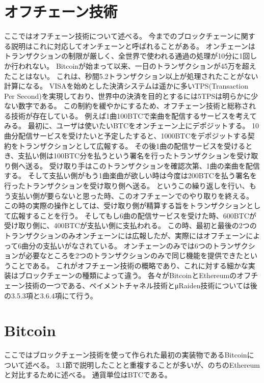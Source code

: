 \section{オフチェーン技術}
ここではオフチェーン技術について述べる。
今までのブロックチェーンに関する説明はこれに対応してオンチェーンと呼ばれることがある。
オンチェーンはトランザクションの制限が厳しく、全世界で使われる通過の処理が10分に1回しか行われない。
Bitcoinが始まって以来、一日のトランザクションが45万を超えたことはない。
これは、秒間5.2トランザクション以上が処理されたことがない計算になる。
VISAを始めとした決済システムは遥かに多いTPS(Transaction Per Second)を実現しており、世界中の決済を目的とするには5TPSは明らかに少ない数字である。
この制約を緩やかにするため、オフチェーン技術と総称される技術が存在している。
例えば1曲100BTCで楽曲を配信するサービスを考えてみる。
最初に、ユーザは使いたいBTCをオンチェーン上にデポジットする。
10曲分配信サービスを受けたいと予定したすると、1000BTCをデポジットする契約をトランザクションとして広報する。
その後1曲の配信サービスを受けるとき、支払い側は100BTC分を払うという署名を行ったトランザクションを受け取り側へ送る。
受け取り手はこのトランザクションを確認次第、1曲の楽曲を配信する。
そして支払い側がもう1曲楽曲が欲しい時は今度は200BTCを払う署名を行ったトランザクションを受け取り側へ送る。
というこの繰り返しを行い、もう支払い側が要らないと思った時、このオフチェーンでのやり取りを終える。
この時の実際の操作としては、受け取り側が精算する旨をトランザクションとして広報することを行う。
そしてもし6曲の配信サービスを受けた時、600BTCが受け取り側に、400BTCが支払い側に支払われる。
この時、最初と最後の2つのトランザクションのみオンチェーンには広報したが、実際にはオフチェーンによって6曲分の支払いがなされている。
オンチェーンのみでは6つのトランザクションが必要なところを2つのトランザクションのみで同じ機能を提供できたということである。
これがオフチェーン技術の概略であり、これに対する細かな実装はブロックチェーンの種類によって違う。
各々がBitcoinとEthereumのオフチェーン技術の一つである、ペイメントチャネル技術とμRaiden技術については後の3.5.3項と3.6.4項にて行う。

\section{Bitcoin}
ここではブロックチェーン技術を使って作られた最初の実装物であるBitcoinについて述べる。
3.1節で説明したことと重複することが多いが、のちのEthereumと対比するために述べる。
通貨単位はBTCである。

